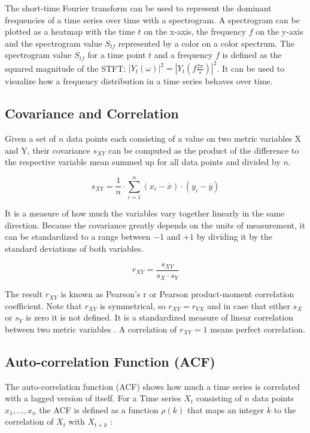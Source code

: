 \documentclass[12 pt]{scrartcl}
\begin{document}
The short-time Fourier transform can be used to represent the dominant frequencies of a time series over time with a spectrogram.
A spectrogram can be plotted as a heatmap with the time $t$ on the x-axis, the frequency $f$ on the y-axis and the spectrogram value $S_{tf}$ represented by a color on a color spectrum.
The spectrogram value $S_{tf}$ for a time point $t$ and a frequency $f$ is defined as the squared magnitude of the STFT: $|Y_t(\omega)|^2 = |Y_t(f \frac{2 \pi}{s})|^2$.
It can be used to visualize how a frequency distribution in a time series behaves over time.

\subsection{Covariance and Correlation}

Given a set of $n$ data points each consisting of a value on two metric variables X and Y, their covariance $s_{XY}$ can be computed as the product of the difference to the respective variable mean summed up for all data points and divided by $n$.

\[ s_{XY} = \frac{1}{n} \cdot  \sum_{i=1}^{n}{(x_i - \overline{x}) \cdot (y_i - \overline{y})}\]

It is a measure of how much the variables vary together linearly in the same direction.
Because the covariance greatly depends on the units of measurement, it can be standardized to a range between $-1$ and $+1$ by dividing it by the standard deviations of both variables.

\[ r_{XY} =  \frac{s_{XY}}{s_X \cdot s_Y} \]

The result $r_{XY}$ is known as Pearson's r or Pearson product-moment correlation coefficient. Note that $r_{XY}$ is symmetrical, so $r_{XY} = r_{YX}$ and in case that either $s_X$ or $s_Y$ is zero it is not defined. It is a standardized measure of linear correlation between two metric variables \citep[p.~538]{eid2017statistik}. A correlation of $r_{XY} = 1$ means perfect correlation.


\subsection{Auto-correlation Function (ACF)}

The auto-correlation function (ACF) shows how much a time series is correlated with a lagged version of itself. For a Time series $X_t$ consisting of $n$ data points $x_1, ..., x_n$ the ACF is defined as a function $\rho(k)$ that maps an integer $k$ to the correlation of $X_t$ with $X_{t+k}$ \citep[p.~4]{deistler2022time}:
\end{document}
